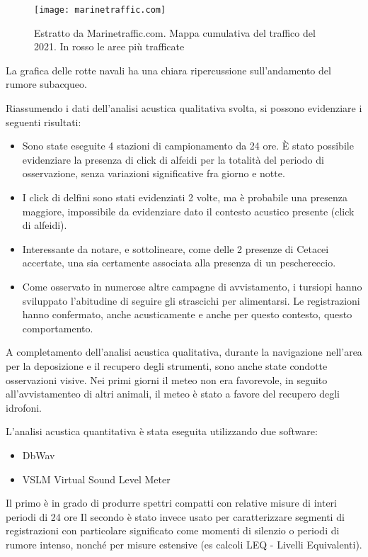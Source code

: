 \begin{figure}[h]
\centering 
\texttt{[image: marinetraffic.com]}
\caption{Estratto da Marinetraffic.com. Mappa cumulativa del traffico del 2021. In rosso le aree più trafficate}
\end{figure} 

La grafica delle rotte navali ha una chiara ripercussione sull’andamento del rumore subacqueo.
 
Riassumendo i dati dell’analisi acustica qualitativa svolta, si possono evidenziare i seguenti risultati: 
\begin{itemize} 
\item Sono state eseguite 4 stazioni di campionamento da 24 ore. È stato possibile evidenziare la presenza di click di alfeidi per la totalità del periodo di osservazione, senza variazioni significative fra giorno e notte. 
\item I click di delfini sono stati evidenziati 2 volte, ma è probabile una presenza maggiore, impossibile da evidenziare dato il contesto acustico presente (click di alfeidi). 
\item Interessante da notare, e sottolineare, come delle 2 presenze di Cetacei accertate, una sia certamente associata alla presenza di un peschereccio. 
\item Come osservato in numerose altre campagne di avvistamento, i tursiopi hanno sviluppato l’abitudine di seguire gli strascichi per alimentarsi. 
Le registrazioni hanno confermato, anche acusticamente e anche per questo contesto, questo comportamento. 
\end{itemize} 

A completamento dell’analisi acustica qualitativa, durante la navigazione nell’area per la deposizione e il recupero degli strumenti, sono anche state condotte osservazioni visive. 
Nei primi giorni il meteo non era favorevole, in seguito all'avvistamenteo di altri animali, il meteo è stato a favore del recupero degli idrofoni. 

L'analisi acustica quantitativa è stata eseguita utilizzando due software: 
\begin{itemize}
\item DbWav %
\item VSLM Virtual Sound Level Meter %
\end{itemize} 

Il primo è in grado di produrre spettri compatti con relative misure di interi periodi di 24 ore
Il secondo è stato invece usato per caratterizzare segmenti di registrazioni con particolare significato come momenti di silenzio o periodi di rumore intenso, nonché per misure estensive (es calcoli LEQ - Livelli Equivalenti).

